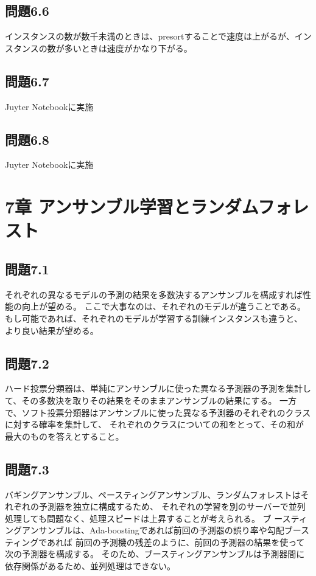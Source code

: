 \documentclass[a4j,twocolumn]{jsarticle}
\begin{document}
\subsection{問題6.6}
インスタンスの数が数千未満のときは、presortすることで速度は上がるが、インスタンスの数が多いときは速度がかなり下がる。

\subsection{問題6.7}
Juyter Notebookに実施

\subsection{問題6.8}
Juyter Notebookに実施

\section{7章 アンサンブル学習とランダムフォレスト}
\subsection{問題7.1}
それぞれの異なるモデルの予測の結果を多数決するアンサンブルを構成すれば性能の向上が望める。
ここで大事なのは、それぞれのモデルが違うことである。もし可能であれば、それぞれのモデルが学習する訓練インスタンスも違うと、
より良い結果が望める。

\subsection{問題7.2}
ハード投票分類器は、単純にアンサンブルに使った異なる予測器の予測を集計して、その多数決を取りその結果をそのままアンサンブルの結果にする。
一方で、ソフト投票分類器はアンサンブルに使った異なる予測器のそれぞれのクラスに対する確率を集計して、
それぞれのクラスについての和をとって、その和が最大のものを答えとすること。

\subsection{問題7.3}
バギングアンサンブル、ペースティングアンサンブル、ランダムフォレストはそれぞれの予測器を独立に構成するため、
それぞれの学習を別のサーバーで並列処理しても問題なく、処理スピードは上昇することが考えられる。
ブ
ースティングアンサンブルは、Ada-boostingであれば前回の予測器の誤り率や勾配ブースティングであれば
前回の予測機の残差のように、前回の予測器の結果を使って次の予測器を構成する。
そのため、ブースティングアンサンブルは予測器間に依存関係があるため、並列処理はできない。
\end{document}
